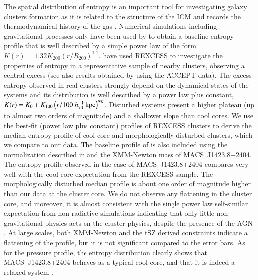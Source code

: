 \documentclass[twocolumn,traditabstract]{aa}
\begin{document}
The spatial distribution of entropy is an important tool for investigating galaxy clusters formation as it is related to the structure of the ICM and records the thermodynamical history of the gas \citep[see][for a review]{voit2005}. Numerical simulations including gravitational processes only have been used by \cite{voit2005b} to obtain a baseline entropy profile that is well described by a simple power law of the form $K(r) = 1.32 K_{200} \left(r/R_{200}\right)^{1.1}$. \cite{pratt2010} have used REXCESS to investigate the properties of entropy in a representative sample of nearby clusters, observing a central excess (see also results obtained by \cite{cavagnolo2009} using the ACCEPT data). The excess entropy observed in real clusters strongly depend on the dynamical states of the systems and its distribution is well described by a power law plus constant, $K(r) = K_0+K_{100} \left(r/100 \ h_{70}^{-1} \ {\rm kpc}\right)^{\alpha_{K}}$. Disturbed systems present a higher plateau (up to almost two orders of magnitude) and a shallower slope than cool cores. We use the best-fit (power law plus constant) profiles of REXCESS clusters \citep[see Tab.~3 of][]{pratt2010} to derive the median entropy profile of cool core and morphologically disturbed clusters, which we compare to our data. The baseline profile of \cite{voit2005b} is also included using the normalization described in \cite{pratt2010} and the XMM-Newton mass of \mbox{MACS~J1423.8+2404}. The entropy profile observed in the case of \mbox{MACS~J1423.8+2404} compares very well with the cool core expectation from the REXCESS sample. The morphologically disturbed median profile is about one order of magnitude higher than our data at the cluster core. We do not observe any flattening in the cluster core, and moreover, it is almost consistent with the single power law self-similar expectation from non-radiative simulations \citep{voit2005b} indicating that only little non-gravitational physics acts on the cluster physics, despite the presence of the AGN \citep[see][for further discussions]{pratt2010}. At large scales, both XMM-Newton and the tSZ derived constraints indicate a flattening of the profile, but it is not significant compared to the error bars. As for the pressure profile, the entropy distribution clearly shows that \mbox{MACS~J1423.8+2404} behaves as a typical cool core, and that it is indeed a relaxed system \citep[as discussed in Sect.~\ref{sec:Introduction}, e.g.][]{kartaltepe2008,limousin2010}. 
\end{document}
